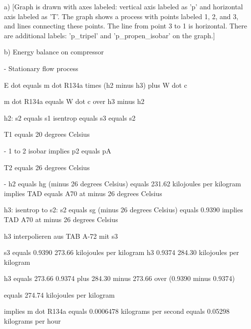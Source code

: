 a) [Graph is drawn with axes labeled: vertical axis labeled as 'p' and horizontal axis labeled as 'T'. The graph shows a process with points labeled 1, 2, and 3, and lines connecting these points. The line from point 3 to 1 is horizontal. There are additional labels: 'p_tripel' and 'p_propen_isobar' on the graph.]

b) Energy balance on compressor

- Stationary flow process

E dot equals m dot R134a times (h2 minus h3) plus W dot c

m dot R134a equals W dot c over h3 minus h2

h2: s2 equals s1 isentrop equals s3 equals s2

T1 equals 20 degrees Celsius

- 1 to 2 isobar implies p2 equals pA

T2 equals 26 degrees Celsius

- h2 equals hg (minus 26 degrees Celsius) equals 231.62 kilojoules per kilogram implies TAD equals A70 at minus 26 degrees Celsius

h3: isentrop to s2: s2 equals sg (minus 26 degrees Celsius) equals 0.9390 implies TAD A70 at minus 26 degrees Celsius

h3 interpolieren aus TAB A-72 mit s3

s3 equals 0.9390 273.66 kilojoules per kilogram h3 0.9374 284.30 kilojoules per kilogram

h3 equals 273.66 0.9374 plus 284.30 minus 273.66 over (0.9390 minus 0.9374)

equals 274.74 kilojoules per kilogram

implies m dot R134a equals 0.0006478 kilograms per second equals 0.05298 kilograms per hour